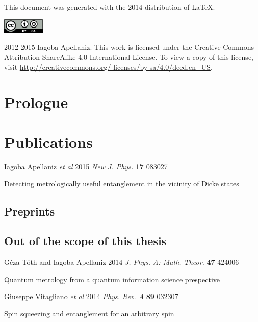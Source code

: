 \documentclass[12pt, letterpaper, twoside]{article}
\begin{document}
\pagestyle{fancy}
\renewcommand{\headrulewidth}{0pt}
\fancyhead{}
\fancyfoot{}





\cleardoublepage

This document was generated with the 2014 distribution of \LaTeX. 

\vfill

\includegraphics[height=20pt]{img/0-CreativeCommons-by-sa.png}

2012-2015 Iagoba Apellaniz. This work is licensed under the Creative Commons
Attribution-ShareAlike 4.0 International License. To view a copy of this
license, visit
\href{http://creativecommons.org/licenses/by-sa/4.0/deed.en_US}
{http://creativecommons.org/ licenses/by-sa/4.0/deed.en\_US}.
\clearpage


\section*{Prologue}
\setcounter{page}{1}
\fancyfoot[LE,RO]{\thepage}



\section*{Publications}
{\setlength{\parindent}{0cm}
Iagoba Apellaniz \textit{et al} 2015 \textit{New J. Phys.} \textbf{17} 083027

Detecting metrologically useful entanglement in the vicinity of Dicke states

\subsection*{Preprints}
\subsection*{Out of the scope of this thesis}
G\'eza T\'oth and Iagoba Apellaniz 2014 \textit{J. Phys. A: Math. Theor.} \textbf{47} 424006

Quantum metrology from a quantum information science prespective
\vspace{10pt}

Giuseppe Vitagliano \textit{et al} 2014 \textit{Phys. Rev. A} \textbf{89} 032307

Spin squeezing and entanglement for an arbitrary spin
}
\end{document}
